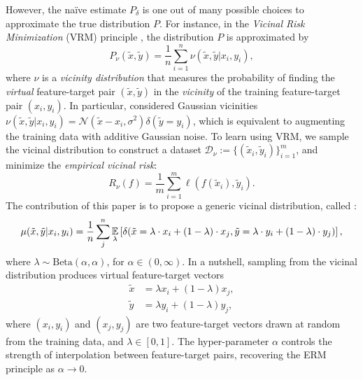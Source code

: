 However, the na\"ive estimate $P_\delta$ is one out of many possible choices to
approximate the true distribution $P$. For instance, in the \emph{Vicinal Risk
Minimization} (VRM) principle \citep{vicinal}, the distribution $P$ is
approximated by
\begin{equation*}
	P_\nu(\tilde{x}, \tilde{y}) = \frac{1}{n} \sum_{i=1}^n \nu(\tilde{x},
\tilde{y} | x_i, y_i),
\end{equation*}
where $\nu$ is a \emph{vicinity distribution} that measures the probability of
finding the \emph{virtual} feature-target pair $(\tilde{x}, \tilde{y})$ in the
\emph{vicinity} of the training feature-target pair $(x_i, y_i)$. In
particular, \citet{vicinal} considered Gaussian vicinities $\nu(\tilde{x},
\tilde{y} | x_i, y_i) = \mathcal{N}(\tilde{x} - x_i, \sigma^2) \delta(\tilde{y}
= y_i)$, which is equivalent to augmenting the training data with additive
Gaussian noise. To learn using VRM, we sample the vicinal distribution to
construct a dataset $\mathcal{D}_\nu := \{(\tilde{x}_i,
\tilde{y}_i)\}_{i=1}^m$, and minimize the \emph{empirical vicinal risk}:
\begin{equation*}
    R_\nu(f) = \frac{1}{m}
    \sum_{i=1}^m \ell(f(\tilde{x}_i), \tilde{y}_i). \label{eq:vrm}
\end{equation*}
The contribution of this paper is to propose a generic vicinal
distribution, called \mixup{}:
\begin{equation*}
   \mu(\tilde{x}, \tilde{y} | x_i, y_i) = \frac{1}{n} \sum_j^n\operatorname*{\mathbb{E}}_{\lambda} \left[ \delta(\tilde{x}
   = \lambda \cdot x_i + (1-\lambda) \cdot x_j, \tilde{y} = \lambda \cdot y_i +
   (1-\lambda) \cdot y_j) \right],
\end{equation*}
where $\lambda \sim \text{Beta}(\alpha, \alpha)$, for $\alpha \in (0, \infty)$.
In a nutshell, sampling from the \mixup{} vicinal distribution produces virtual
feature-target vectors
\begin{align*}
  \tilde{x} &= \lambda x_i + (1 - \lambda) x_j,\\
  \tilde{y} &= \lambda y_i + (1 - \lambda) y_j,
\end{align*}
where $(x_i, y_i)$ and $(x_j, y_j)$ are two feature-target vectors drawn at
random from the training data, and $\lambda \in [0, 1]$. The \mixup{}
hyper-parameter $\alpha$ controls the strength of interpolation between
feature-target pairs, recovering the ERM principle as $\alpha \to 0$.


